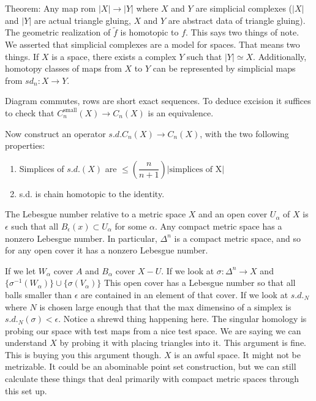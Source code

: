 \documentclass[10pt]{article}
\theoremstyle{definition}
\begin{document}
	Theorem: Any map rom $|X|\to |Y|$ where $X$ and $Y$ are simplicial complexes ($|X|$ and $|Y|$ are actual triangle gluing, $X$ and $Y$ are abstract data of triangle gluing). The geometric realization of $\tilde f$ is homotopic to $f$. This says two things of note. We asserted that simplicial complexes are a model for spaces. That means two things. If $X$ is a space, there exists a complex $Y$ such that $|Y|\simeq X$. Additionally, homotopy classes of maps from $X$ to $Y$ can be represented by simplicial maps from $sd_n: X\to Y$. 
	\begin{center}
	\end{center}
	Diagram commutes, rows are short exact sequences. To deduce excision it suffices to check that $C_n^{\text{small}}(X)\to C_n(X)$ is an equivalence. 
	
	Now construct an operator $s.d.C_n(X)\to C_n(X)$, with the two following properties:
	\begin{enumerate}
		\item Simplices of $s.d.(X)$ are $\leq \left(\dfrac{n}{n+1}\right)\left|\text{simplices of X}\right|$ 
		\item  s.d. is chain homotopic to the identity.
	\end{enumerate}
	The Lebesgue number relative to a metric space $X$ and an open cover $U_\alpha$ of $X$ is $\epsilon$ such that all $B_\epsilon(x)\subset U_\alpha$ for some $\alpha$. Any compact metric space has a nonzero Lebesgue number. In particular, $\Delta^n$ is a compact metric space, and so for any open cover it has a nonzero Lebesgue number. 
	
	If we let $W_\alpha$ cover $A$ and $B_\alpha$ cover $X-U$. If we look at $\sigma:\Delta^n\to X$ and $\{\sigma^{-1}(W_\alpha)\}\cup \{\sigma(V_\alpha)\}$ This open cover has a Lebesgue number so that all balls smaller than $\epsilon$ are contained in an element of that cover. If we look at $s.d._N$ where $N$ is chosen large enough that that the max dimensino of a simplex is $s.d._N(\sigma)<\epsilon$. Notice a shrewd thing happening here. The singular homology is probing our space with test maps from a nice test space. We are saying we can understand $X$ by probing it with placing triangles into it. This argument is fine. This is buying you this argument though. $X$ is an awful space. It might not be metrizable. It could be an abominable point set construction, but we can still calculate these things that deal primarily with compact metric spaces through this set up. 
	
\end{document}
